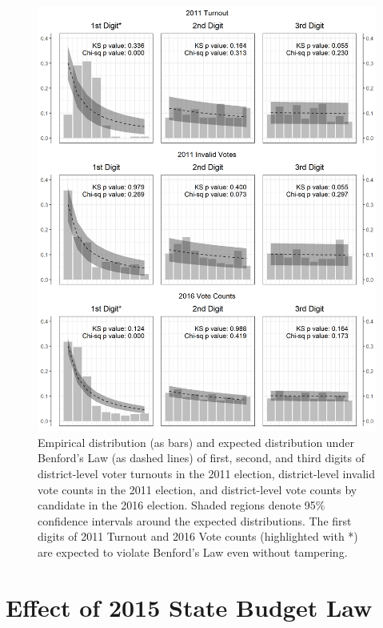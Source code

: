\documentclass[12pt]{article}
\newcommand{\1}{\mathbbm{1}}
\begin{document}
\begin{figure}[!htbp]
	\centering
	\includegraphics[height=.85\textheight]{figure/190716_digit_test.png}
	\caption[Digit Test of Election Results]{Empirical distribution (as bars) and expected distribution under Benford's Law (as dashed lines) of first, second, and third digits of district-level voter turnouts in the 2011 election, district-level invalid vote counts in the 2011 election, and district-level vote counts by candidate in the 2016 election. Shaded regions denote 95\% confidence intervals around the expected distributions. The first digits of 2011 Turnout and 2016 Vote counts (highlighted with \textsf{*}) are expected to violate Benford's Law even without tampering.}
	\label{fig:Benford}
\end{figure}

\clearpage

\section{Effect of 2015 State Budget Law}
\end{document}
